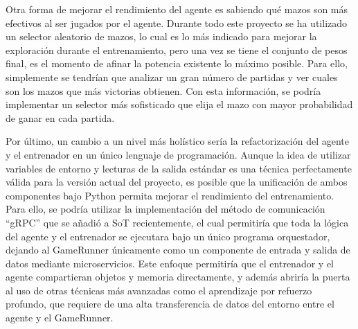 Otra forma de mejorar el rendimiento del agente es sabiendo qué mazos son más efectivos al ser jugados por el agente. Durante todo este proyecto se ha utilizado un selector aleatorio de mazos, lo cual es lo más indicado para mejorar la exploración durante el entrenamiento, pero una vez se tiene el conjunto de pesos final, es el momento de afinar la potencia existente lo máximo posible. Para ello, simplemente se tendrían que analizar un gran número de partidas y ver cuales son los mazos que más victorias obtienen. Con esta información, se podría implementar un selector más sofisticado que elija el mazo con mayor probabilidad de ganar en cada partida.

Por último, un cambio a un nivel más holístico sería la refactorización del agente y el entrenador en un único lenguaje de programación. Aunque la idea de utilizar variables de entorno y lecturas de la salida estándar es una técnica perfectamente válida para la versión actual del proyecto, es posible que la unificación de ambos componentes bajo Python permita mejorar el rendimiento del entrenamiento. Para ello, se podría utilizar la implementación del método de comunicación ``gRPC'' que se añadió a SoT recientemente, el cual permitiría que toda la lógica del agente y el entrenador se ejecutara bajo un único programa orquestador, dejando al GameRunner únicamente como un componente de entrada y salida de datos mediante microservicios. Este enfoque permitiría que el entrenador y el agente compartieran objetos y memoria directamente, y además abriría la puerta al uso de otras técnicas más avanzadas como el aprendizaje por refuerzo profundo, que requiere de una alta transferencia de datos del entorno entre el agente y el GameRunner.